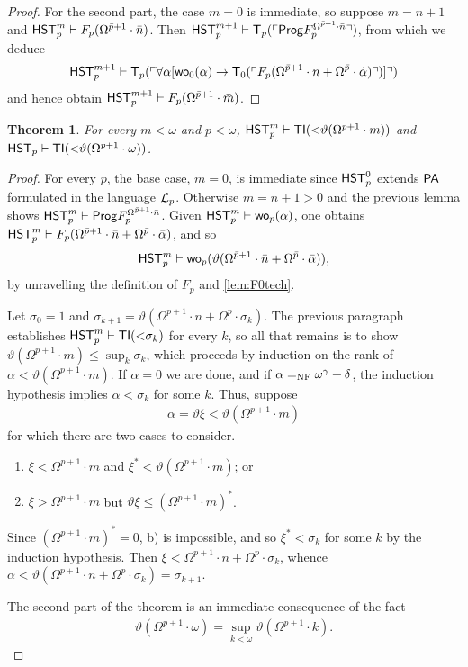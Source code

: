 \documentclass[UKenglish,cleveref,DIV=12]{scrartcl}
\newtheorem{theorem}{Theorem}
\theoremstyle{definition}
\theoremstyle{definition}
\begin{document}
\begin{proof}
For the second part, the case $m=0$ is immediate, so suppose $m=n+1$ and $\mathsf{HST}_p^m\vdash
F_p(\Omega^{\bar p+1}\cdot\bar n)$. Then
$\mathsf{HST}_p^{m+1}\vdash\mathsf{T}_p(\ulcorner{\mathsf{Prog}F_p^{\Omega^{\bar p+1}\cdot\bar n}}\urcorner)$, from which we deduce
\begin{align*}
  \mathsf{HST}_p^{m+1}\vdash\mathsf{T}_p(\ulcorner{\forall\alpha[\mathsf{wo}_0(\alpha)\rightarrow\mathsf{T}_0(\ulcorner{F_p(\Omega^{\bar p+1}\cdot\bar n+\Omega^{\bar p}\cdot\dot\alpha)}\urcorner)]}\urcorner)
\end{align*}
and hence obtain $\mathsf{HST}_p^{m+1}\vdash F_p(\Omega^{\bar p+1}\cdot\bar m)$.
\end{proof}
\begin{theorem}\label{thm:Fplowerbound}
 For every $m<\omega$ and $p<\omega$,
$\mathsf{HST}_p^{m}\vdash\mathsf{TI}(\mathord<\vartheta(\Omega^{p+1}\cdot m))$ and
$\mathsf{HST}_p\vdash\mathsf{TI}(\mathord<\vartheta(\Omega^{p+1}\cdot\omega))$.
\end{theorem}
\begin{proof}
For every $p$, the base case, $m=0$, is immediate since $\mathsf{HST}_p^0$ extends $\mathsf{PA}$
formulated in the language $\mathcal{L}_p$. Otherwise $m=n+1>0$ and the previous lemma
shows $\mathsf{HST}_p^m\vdash\mathsf{Prog} F_p^{\Omega^{\bar p+1}\cdot\bar n}$. Given $\mathsf{HST}_p^m\vdash
\mathsf{wo}_p(\bar \alpha)$, one obtains $\mathsf{HST}_p^m\vdash F_p(\Omega^{\bar p+1}\cdot\bar
n+\Omega^{\bar p}\cdot\bar\alpha)$, and so
\begin{align*}
  \mathsf{HST}_p^m\vdash\mathsf{wo}_p(\vartheta(\Omega^{\bar p+1}\cdot\bar n+\Omega^{\bar p}\cdot\bar\alpha)),
\end{align*}
by unravelling the definition of $F_p$ and \cref{lem:F0tech}.

Let $\sigma_0=1$ and $\sigma_{k+1}=\vartheta(\Omega^{p+1}\cdot
n+\Omega^p\cdot\sigma_k)$. The previous paragraph establishes $\mathsf{HST}_p^m\vdash
\mathsf{TI}(\mathord<\sigma_k)$ for every $k$, so all that remains is to show
$\vartheta(\Omega^{p+1}\cdot m)\le\sup_k\sigma_k$, which proceeds by induction
on the rank of $\alpha<\vartheta(\Omega^{p+1}\cdot m)$. If $\alpha=0$ we are
done, and if $\alpha=_{\mathrm{NF}}\omega^\gamma+\delta$, the induction hypothesis implies
$\alpha<\sigma_k$ for some $k$. Thus, suppose
\begin{gather*}
  \alpha=\vartheta\xi<\vartheta(\Omega^{p+1}\cdot m)
\end{gather*}
for which there are two cases to consider.
\begin{enumerate}
 \item $\xi<\Omega^{p+1}\cdot m$ and $\xi^*<\vartheta(\Omega^{p+1}\cdot m)$; or
 \item $\xi>\Omega^{p+1}\cdot m$ but $\vartheta\xi\le(\Omega^{p+1}\cdot m)^*$.
\end{enumerate}
Since $(\Omega^{p+1}\cdot m)^*=0$, b) is impossible, and so
$\xi^*<\sigma_k$ for some $k$ by the induction hypothesis. Then
$\xi<\Omega^{p+1}\cdot n+\Omega^p\cdot\sigma_k$, whence
$\alpha<\vartheta(\Omega^{p+1}\cdot n+\Omega^p\cdot\sigma_k)=\sigma_{k+1}$.

The second part of the theorem is an immediate consequence of the fact
\begin{align*}
  \vartheta(\Omega^{p+1}\cdot \omega)=\sup_{k<\omega}\vartheta(\Omega^{p+1}\cdot k).
\end{align*}
\end{proof}
\end{document}
